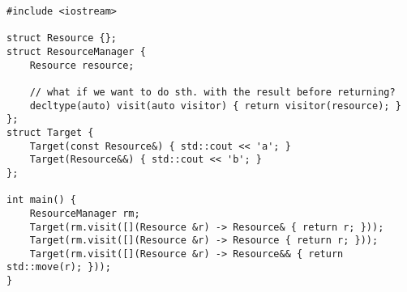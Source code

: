 \begin{lstlisting}[title=\href{https://godbolt.org/z/VkN9fE}{\texttt{godbolt.org/z/VkN9fE}}]
#include <iostream>

struct Resource {};
struct ResourceManager {
    Resource resource;

    // what if we want to do sth. with the result before returning?
    decltype(auto) visit(auto visitor) { return visitor(resource); }
};
struct Target {
    Target(const Resource&) { std::cout << 'a'; }
    Target(Resource&&) { std::cout << 'b'; }
};

int main() {
    ResourceManager rm;
    Target(rm.visit([](Resource &r) -> Resource& { return r; }));
    Target(rm.visit([](Resource &r) -> Resource { return r; }));
    Target(rm.visit([](Resource &r) -> Resource&& { return std::move(r); }));
}
\end{lstlisting}

